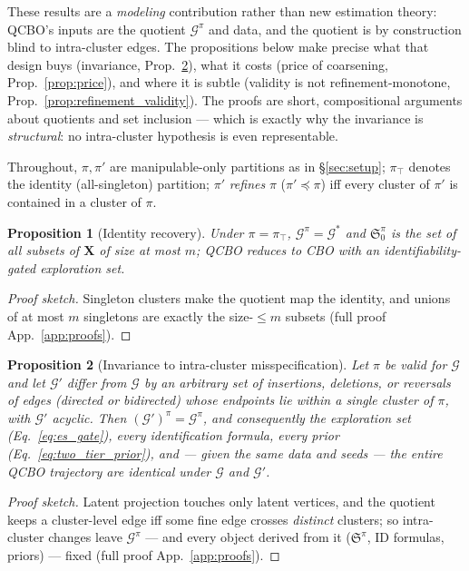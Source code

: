 \documentclass{article}
\newtheorem{proposition}{Proposition}
\newcommand{\QCBO}{\textsc{QCBO}}
\newcommand{\CBO}{\textsc{CBO}}
\newcommand{\Gq}{\mathcal{G}^{\pi}}
\newcommand{\Gg}{\mathcal{G}}
\newcommand{\ESpi}{\mathfrak{S}^{\pi}}
\begin{document}
These results are a \emph{modeling} contribution rather than new estimation
theory: \QCBO{}'s inputs are the quotient $\Gq$ and data, and the quotient is
by construction blind to intra-cluster edges. The propositions below make
precise what that design buys (invariance, Prop.~\ref{prop:invariance}), what
it costs (price of coarsening, Prop.~\ref{prop:price}), and where it is subtle
(validity is not refinement-monotone, Prop.~\ref{prop:refinement_validity}).
The proofs are short, compositional arguments about quotients and set
inclusion --- which is exactly why the invariance is \emph{structural}: no
intra-cluster hypothesis is even representable.

Throughout, $\pi, \pi'$ are manipulable-only partitions as in
\S\ref{sec:setup}; $\pi_\top$ denotes the identity (all-singleton)
partition; $\pi'$ \emph{refines} $\pi$ ($\pi' \preceq \pi$) iff every
cluster of $\pi'$ is contained in a cluster of $\pi$.

\begin{proposition}[Identity recovery]
\label{prop:identity}
Under $\pi=\pi_\top$, $\Gq = \Gg^{*}$ and $\ESpi_0$ is the set of all
subsets of $\mathbf{X}$ of size at most $m$; \QCBO{} reduces to \CBO{}
with an identifiability-gated exploration set.
\end{proposition}
\begin{proof}[Proof sketch]
Singleton clusters make the quotient map the identity, and unions of at most
$m$ singletons are exactly the size-$\le m$ subsets (full proof
App.~\ref{app:proofs}).
\end{proof}

\begin{proposition}[Invariance to intra-cluster misspecification]
\label{prop:invariance}
Let $\pi$ be valid for $\Gg$ and let $\Gg'$ differ from $\Gg$ by an
arbitrary set of insertions, deletions, or reversals of edges (directed or
bidirected) whose endpoints lie within a single cluster of $\pi$, with
$\Gg'$ acyclic. Then $(\Gg')^{\pi} = \Gq$, and consequently the
exploration set (Eq.~\ref{eq:es_gate}), every identification formula, every
prior (Eq.~\ref{eq:two_tier_prior}), and --- given the same data and seeds
--- the entire \QCBO{} trajectory are identical under $\Gg$ and $\Gg'$.
\end{proposition}
\begin{proof}[Proof sketch]
Latent projection touches only latent vertices, and the quotient keeps a
cluster-level edge iff some fine edge crosses \emph{distinct} clusters; so
intra-cluster changes leave $\Gq$ --- and every object derived from it
($\ESpi$, ID formulas, priors) --- fixed (full proof App.~\ref{app:proofs}).
\end{proof}
\end{document}
